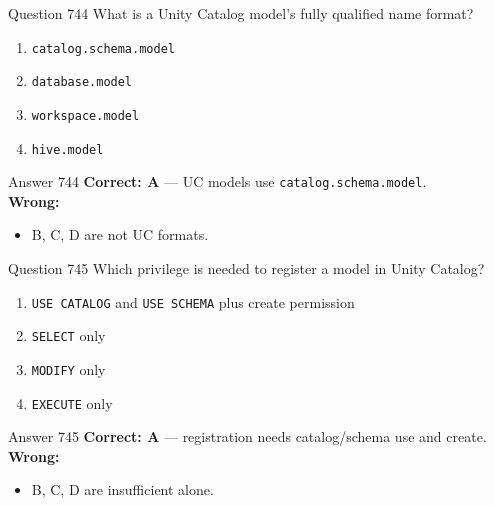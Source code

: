 \documentclass[aspectratio=169,11pt]{beamer}
\begin{document}
	\begin{frame}{Question 744}
		What is a Unity Catalog model's fully qualified name format?
		\begin{enumerate}[label=\Alph*.]
			\item \texttt{catalog.schema.model}
			\item \texttt{database.model}
			\item \texttt{workspace.model}
			\item \texttt{hive.model}
		\end{enumerate}
	\end{frame}
	\begin{frame}{Answer 744}
		\textbf{Correct: A} --- UC models use \texttt{catalog.schema.model}.\\
		\vspace{0.5em}
		\textbf{Wrong:}
		\begin{itemize}
			\item B, C, D are not UC formats.
		\end{itemize}
	\end{frame}
	
	\begin{frame}{Question 745}
		Which privilege is needed to register a model in Unity Catalog?
		\begin{enumerate}[label=\Alph*.]
			\item \texttt{USE CATALOG} and \texttt{USE SCHEMA} plus create permission
			\item \texttt{SELECT} only
			\item \texttt{MODIFY} only
			\item \texttt{EXECUTE} only
		\end{enumerate}
	\end{frame}
	\begin{frame}{Answer 745}
		\textbf{Correct: A} --- registration needs catalog/schema use and create.\\
		\vspace{0.5em}
		\textbf{Wrong:}
		\begin{itemize}
			\item B, C, D are insufficient alone.
		\end{itemize}
	\end{frame}
	
\end{document}
